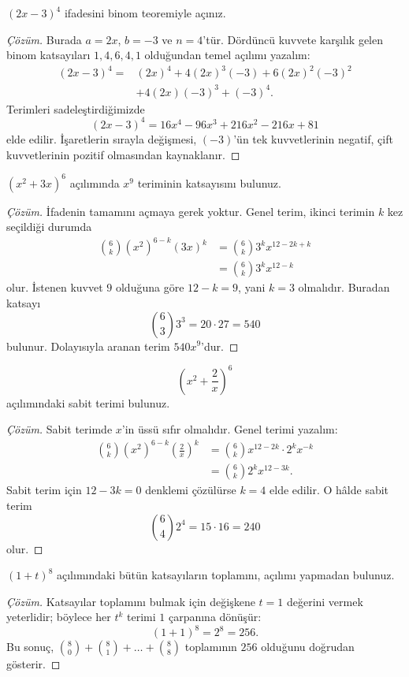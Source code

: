 \begin{example}
$(2x-3)^4$ ifadesini binom teoremiyle açınız.
\end{example}
\begin{proof}[Çözüm]
Burada $a=2x$, $b=-3$ ve $n=4$'tür. Dördüncü kuvvete karşılık gelen binom katsayıları $1,4,6,4,1$ olduğundan temel açılımı yazalım:
\begin{align*}
(2x-3)^4={}&(2x)^4+4(2x)^3(-3)+6(2x)^2(-3)^2\\
&+4(2x)(-3)^3+(-3)^4.
\end{align*}
Terimleri sadeleştirdiğimizde
\[
\boxed{(2x-3)^4=16x^4-96x^3+216x^2-216x+81}
\]
elde edilir. İşaretlerin sırayla değişmesi, $(-3)$'ün tek kuvvetlerinin negatif, çift kuvvetlerinin pozitif olmasından kaynaklanır.
\end{proof}

\begin{example}
$(x^2+3x)^6$ açılımında $x^9$ teriminin katsayısını bulunuz.
\end{example}
\begin{proof}[Çözüm]
İfadenin tamamını açmaya gerek yoktur. Genel terim, ikinci terimin $k$ kez seçildiği durumda
\begin{align*}
\binom{6}{k}(x^2)^{6-k}(3x)^k
&=\binom{6}{k}3^k x^{12-2k+k}\\
&=\binom{6}{k}3^k x^{12-k}
\end{align*}
olur. İstenen kuvvet $9$ olduğuna göre $12-k=9$, yani $k=3$ olmalıdır. Buradan katsayı
\[
\binom{6}{3}3^3=20\cdot27=540
\]
bulunur. Dolayısıyla aranan terim $540x^9$'dur.
\end{proof}

\begin{example}
\[\left(x^2+\frac{2}{x}\right)^6\]
açılımındaki sabit terimi bulunuz.
\end{example}
\begin{proof}[Çözüm]
Sabit terimde $x$'in üssü sıfır olmalıdır. Genel terimi yazalım:
\begin{align*}
\binom{6}{k}(x^2)^{6-k}\left(\frac{2}{x}\right)^k
&=\binom{6}{k}x^{12-2k}\cdot2^kx^{-k}\\
&=\binom{6}{k}2^kx^{12-3k}.
\end{align*}
Sabit terim için $12-3k=0$ denklemi çözülürse $k=4$ elde edilir. O hâlde sabit terim
\[
\binom{6}{4}2^4=15\cdot16=240
\]
olur.
\end{proof}

\begin{example}
$(1+t)^8$ açılımındaki bütün katsayıların toplamını, açılımı yapmadan bulunuz.
\end{example}
\begin{proof}[Çözüm]
Katsayılar toplamını bulmak için değişkene $t=1$ değerini vermek yeterlidir; böylece her $t^k$ terimi $1$ çarpanına dönüşür:
\[
(1+1)^8=2^8=256.
\]
Bu sonuç, $\binom80+\binom81+\dots+\binom88$ toplamının $256$ olduğunu doğrudan gösterir.
\end{proof}

